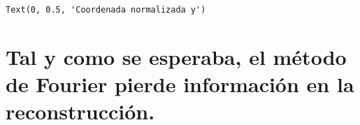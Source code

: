 \documentclass[11pt]{article}
\makeatletter
\newcommand{\boxspacing}{\kern\kvtcb@left@rule\kern\kvtcb@boxsep}
\newcommand{\prompt}[4]{
        {\ttfamily\llap{{\color{#2}[#3]:\hspace{3pt}#4}}\vspace{-\baselineskip}}
    }
\makeatother
\begin{document}
            \begin{tcolorbox}[breakable, size=fbox, boxrule=.5pt, pad at break*=1mm, opacityfill=0]
\prompt{Out}{outcolor}{13}{\boxspacing}
\begin{Verbatim}[commandchars=\\\{\}]
Text(0, 0.5, 'Coordenada normalizada y')
\end{Verbatim}
\end{tcolorbox}
        
    \begin{center}
    \end{center}
     \vspace{0.7cm}
    
    \begin{center}
    \end{center}
     \vspace{0.7cm}
    
    \hypertarget{tal-y-como-se-esperaba-el-muxe9todo-de-fourier-pierde-informaciuxf3n-en-la-reconstrucciuxf3n.}{%
\section*{Tal y como se esperaba, el método de Fourier pierde información
en la
reconstrucción.}\label{tal-y-como-se-esperaba-el-muxe9todo-de-fourier-pierde-informaciuxf3n-en-la-reconstrucciuxf3n.}}


    
    
    
\end{document}
